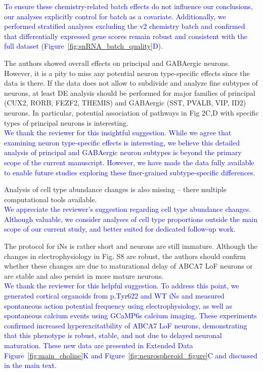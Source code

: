\textcolor{blue}{To ensure these chemistry-related batch effects do not influence our conclusions, our analyses explicitly control for batch as a covariate. Additionally, we performed stratified analyses excluding the v2 chemistry batch and confirmed that differentially expressed gene scores remain robust and consistent with the full dataset (Figure~\ref{fig:snRNA_batch_quality}D).}

The authors showed overall effects on principal and GABAergic neurons. However, it is a pity to miss any potential neuron type-specific effects since the data is there. If the data does not allow to subdivide and analyze fine subtypes of neurons, at least DE analysis should be performed for major families of principal (CUX2, RORB, FEZF2, THEMIS) and GABAergic (SST, PVALB, VIP, ID2) neurons. In particular, potential association of pathways in Fig 2C,D with specific types of principal neurons is interesting.\\
\textcolor{blue}{We thank the reviewer for this insightful suggestion. While we agree that examining neuron type-specific effects is interesting, we believe this detailed analysis of principal and GABAergic neuron subtypes is beyond the primary scope of the current manuscript. However, we have made the data fully available to enable future studies exploring these finer-grained subtype-specific differences.}

Analysis of cell type abundance changes is also missing – there multiple computational tools available.\\
\textcolor{blue}{We appreciate the reviewer’s suggestion regarding cell type abundance changes. Although valuable, we consider analyses of cell type proportions outside the main scope of our current study, and better suited for dedicated follow-up work.}

The protocol for iNs is rather short and neurons are still immature. Although the changes in electrophysiology in Fig. S8 are robust, the authors should confirm whether these changes are due to maturational delay of ABCA7 LoF neurons or are stable and also persist in more mature neurons.\\
\textcolor{blue}{We thank the reviewer for this helpful suggestion. To address this point, we generated cortical organoids from p.Tyr622 and WT iNs and measured spontaneous action potential frequency using electrophysiology, as well as spontaneous calcium events using GCaMP6s calcium imaging. These experiments confirmed increased hyperexcitatbility of ABCA7 LoF neurons, demonstrating that this phenotype is robust, stable, and not due to delayed neuronal maturation. These new data are presented in Extended Data Figure~\ref{fig:main_choline}K and Figure~\ref{fig:neurospheroid_figure}C and discussed in the main text.}

